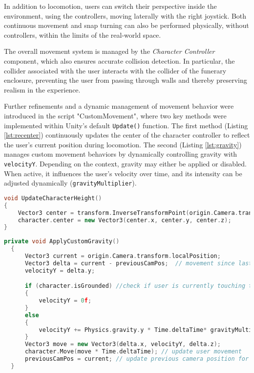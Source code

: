 In addition to locomotion, users can switch their perspective inside the environment, using the controllers, moving laterally with the right joystick.
Both continuous movement and snap turning can also be performed physically, without controllers, within the limits of the real-world space.

The overall movement system is managed by the \emph{Character Controller} component, which also ensures accurate collision detection. In particular, the collider associated with the user interacts with the collider of the funerary enclosure, preventing the user from passing through walls and thereby preserving realism in the experience.

Further refinements and a dynamic management of movement behavior were introduced in the script "CustomMovement", where two key methods were implemented within Unity’s default \texttt{Update()} function.
The first method (Listing \ref{lst:recenter}) continuously updates the center of the character controller to reflect the user’s current position during locomotion. 
The second (Listing \ref{lst:gravity}) manages custom movement behaviors by dynamically controlling gravity with \texttt{velocityY}. 
Depending on the context, gravity may either be applied or disabled. When active, it influences the user’s velocity over time, and its intensity can be adjusted dynamically (\texttt{gravityMultiplier}).

\begin{lstlisting}[language=C++, caption={Recenter user position method.}, label={lst:recenter}]
void UpdateCharacterHeight()
{
    Vector3 center = transform.InverseTransformPoint(origin.Camera.transform.position);
    character.center = new Vector3(center.x, center.y, center.z);
}
\end{lstlisting}


\begin{lstlisting}[language=C++, caption={Apply costum gravity method.}, label={lst:gravity}]
  private void ApplyCustomGravity()
  {
      Vector3 current = origin.Camera.transform.localPosition;
      Vector3 delta = current - previousCamPos;  // movement since last frame
      velocityY = delta.y;

      if (character.isGrounded) //check if user is currently touching the ground plan
      {
          velocityY = 0f;
      }
      else
      {
          velocityY += Physics.gravity.y * Time.deltaTime* gravityMultiplier; // Apply custom gravity 
      }
      Vector3 move = new Vector3(delta.x, velocityY, delta.z);
      character.Move(move * Time.deltaTime); // update user movement
      previousCamPos = current; // update previous camera position for next frame
  }
\end{lstlisting}


